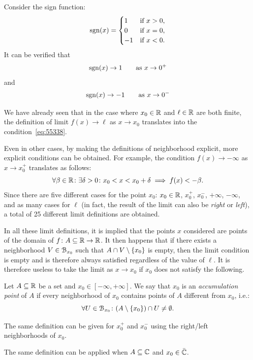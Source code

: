 \begin{example}
Consider the sign function:
\[
\operatorname{sgn}(x) =
\begin{cases}
  1 & \text{if $x>0$},\\
  0 & \text{if $x=0$},\\
  -1 & \text{if $x<0$}.
\end{cases}
\]
It can be verified that
\[
\operatorname{sgn}(x) \to 1 \qquad \text{as $x\to 0^+$}
\]
and
\[
\operatorname{sgn}(x) \to -1 \qquad \text{as $x\to 0^-$}
\]
\end{example}

We have already seen that in the case where $x_0\in {\mathbb R}$ and $\ell\in {\mathbb R}$ 
are both finite, 
the definition of limit $f(x)\to \ell$ as $x\to x_0$
translates into the condition~\eqref{eq:55338}.

Even in other cases, by making the definitions of neighborhood explicit,
more explicit conditions can be obtained.
For example, the condition $f(x)\to -\infty$ as $x\to x_0^+$
translates as follows:
\[
\forall \beta\in {\mathbb R}\colon \exists \delta>0 \colon x_0 < x < x_0+\delta 
\implies f(x) < -\beta.  
\]
Since there are five different cases for the point $x_0$:
$x_0\in {\mathbb R}$, $x_0^+$, $x_0^-$, $+\infty$, $-\infty$, and as many 
cases for $\ell$ (in fact, the result of the limit 
can also be \emph{right} or \emph{left}), a total of 25 different limit
definitions are obtained.

In all these limit definitions, it is implied that the points 
$x$ considered are points 
of the domain of $f\colon A \subseteq {\mathbb R} \to {\mathbb R}$.
It then happens that if there exists a neighborhood $V\in \mathcal B_{x_0}$
such that $A \cap V \setminus {\left\{ x_0 \right\}}$ is empty, then 
the limit condition is empty and is therefore always satisfied 
regardless of the value of $\ell$. 
It is therefore useless to take the limit as $x\to x_0$ 
if $x_0$ does not satisfy the following.

\begin{definition}
  \mymark{*}
  Let $A\subseteq  {\mathbb R}$ be a set and $x_0\in [-\infty, +\infty]$.
  We say that $x_0$ is an \emph{accumulation point}%
%
 of $A$
    if every neighborhood of $x_0$ contains points of $A$ different from $x_0$,
  i.e.:
  \[
   \forall U \in \mathcal B_{x_0}\colon (A\setminus {\left\{ x_0 \right\}}) \cap U \neq \emptyset.
  \]

  The same definition can be given for $x_0^+$ and $x_0^-$ 
  using the right/left neighborhoods of $x_0$. 

  The same definition can be applied 
  when $A\subseteq {\mathbb C}$ and $x_0\in \bar {{\mathbb C}}$.
\end{definition}

